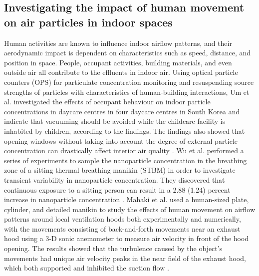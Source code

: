 \documentclass[acmtog]{acmart}
\begin{document}
\subsection{Investigating the impact of human movement on air particles in indoor spaces}
Human activities are known to influence indoor airflow patterns, and their aerodynamic impact is dependent on characteristics such as speed, distance, and position in space. People, occupant activities, building materials, and even outside air all contribute to the effluents in indoor air. Using optical particle counters (OPS) for particulate concentration monitoring and resuspending source strengths of particles with characteristics of human-building interactions, Um et al. investigated the effects of occupant behaviour on indoor particle concentrations in daycare centres in four daycare centres in South Korea and indicate that vacuuming should be avoided while the childcare facility is inhabited by children, according to the findings. The findings also showed that opening windows without taking into account the degree of external particle concentration can drastically affect interior air quality \cite{um2022occupant}.  Wu et al. performed a series of experiments to sample the nanoparticle concentration in the breathing zone of a sitting thermal breathing manikin (STBM) in order to investigate transient variability in nanoparticle concentration. They discovered that continuous exposure to a sitting person can result in a 2.88 (1.24) percent increase in nanoparticle concentration \cite{wu2022transient}. Mahaki et al. used a human-sized plate, cylinder, and detailed manikin to study the effects of human movement on airflow patterns around local ventilation hoods both experimentally and numerically, with the movements consisting of back-and-forth movements near an exhaust hood using a 3-D sonic anemometer to measure air velocity in front of the hood opening. The results showed that the turbulence caused by the object's movements had unique air velocity peaks in the near field of the exhaust hood, which both supported and inhibited the suction flow \cite{mahaki2021comparing}.
\end{document}
